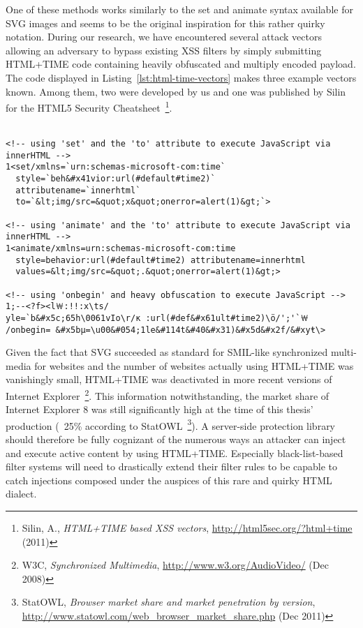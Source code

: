     One of these methods works similarly to the set and animate syntax available for SVG images and seems to be the original inspiration for this rather quirky notation. During our research, we have encountered several attack vectors allowing an adversary to bypass existing XSS filters by simply submitting HTML+TIME code containing heavily obfuscated and multiply encoded payload. The code displayed in Listing~\ref{lst:html-time-vectors} makes three example vectors known. Among them, two were developed by us and one was published by Silin for the HTML5 Security Cheatsheet~\footnote{Silin, A., \textit{HTML+TIME based XSS vectors}, \url{http://html5sec.org/?html+time} (2011)}.\\
\\

\begin{lstlisting}[captionpos=b,label=lst:html-time-vectors,caption=Executing obfuscated JavaScript via HTML+TIME; explanations are visible inline]
<!-- using 'set' and the 'to' attribute to execute JavaScript via innerHTML -->
1<set/xmlns=`urn:schemas-microsoft-com:time` 
  style=`beh&#x41vior:url(#default#time2)` 
  attributename=`innerhtml` 
  to=`&lt;img/src=&quot;x&quot;onerror=alert(1)&gt;`>

<!-- using 'animate' and the 'to' attribute to execute JavaScript via innerHTML -->
1<animate/xmlns=urn:schemas-microsoft-com:time 
  style=behavior:url(#default#time2) attributename=innerhtml 
  values=&lt;img/src=&quot;.&quot;onerror=alert(1)&gt;>

<!-- using 'onbegin' and heavy obfuscation to execute JavaScript -->
1;--<?f><l￦:!!:x\‮/st
yle=`b&#x5c;65h\0061vIo\r/ĸ :url(#def&#x61ult#time2)\ö/';'`￦
/onbegin= &#x5bµ=\u00&#054;1le&#114t&#40&#x31)&#x5d&#x2f/&#xyŧ\>
\end{lstlisting}

  Given the fact that SVG succeeded as standard for SMIL-like synchronized multi-media for websites and the number of websites actually using HTML+TIME was vanishingly small, HTML+TIME was deactivated in more recent versions of Internet Explorer~\footnote{W3C, \textit{Synchronized Multimedia}, \url{http://www.w3.org/AudioVideo/} (Dec 2008)}. This information notwithstanding, the market share of Internet Explorer 8 was still significantly high at the time of this thesis' production (~25\% according to StatOWL~\footnote{StatOWL, \textit{Browser market share and market penetration by version}, \url{http://www.statowl.com/web_browser_market_share.php} (Dec 2011)}). A server-side protection library should therefore be fully cognizant of the numerous ways an attacker can inject and execute active content by using HTML+TIME. Especially black-list-based filter systems will need to drastically extend their filter rules to be capable to catch injections composed under the auspices of this rare and quirky HTML dialect.\
\

